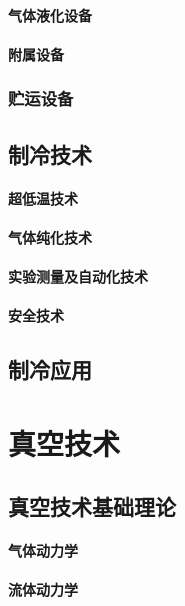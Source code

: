 \documentclass[UTF8]{../../ApplicationUniverse}
\begin{document}
        \subsubsection{气体液化设备}
        \subsubsection{附属设备}
    \subsection{贮运设备}
\section{制冷技术}
    \subsubsection{超低温技术}
    \subsubsection{气体纯化技术}
    \subsubsection{实验测量及自动化技术}
    \subsubsection{安全技术}
\section{制冷应用}













\chapter{真空技术}
\section{真空技术基础理论}
    \subsubsection{气体动力学}
    \subsubsection{流体动力学}
\end{document}
